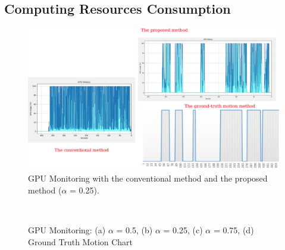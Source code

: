  \subsection{Computing Resources Consumption}
\begin{figure}
\centering
	\includegraphics[scale=0.35]{Figures/gpu_compare.png}
\caption{GPU Monitoring with the conventional method and the proposed method ($\alpha$ = 0.25).}
\label{fig:gpu}
\end{figure}
\begin{figure}
\centering
{}
\\
\caption{GPU Monitoring: (a) $\alpha$ = 0.5, (b) $\alpha$ = 0.25, (c) $\alpha$ = 0.75, (d) Ground Truth Motion Chart }
\label{fig:gpu_monitor}
\end{figure}
